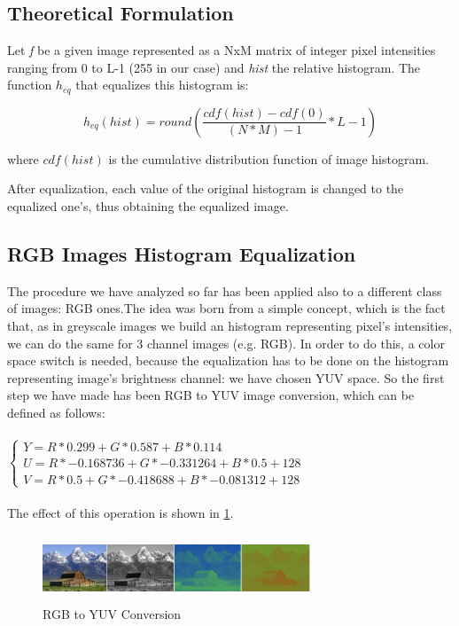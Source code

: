 \documentclass[10pt,twocolumn,letterpaper]{article}
\begin{document}
\subsection{Theoretical Formulation}
Let \textit{f} be a given image represented as a NxM matrix of integer pixel intensities ranging from 0 to L-1 (255 in our case) and \textit{hist} the relative histogram.
The function ${h_{eq}}$ that equalizes this histogram is:

\begin{equation}
	h_{eq}(hist) =  round(\frac{cdf(hist) - cdf(0)}{(N * M) - 1} * L - 1)
	\label{equalization}
\end{equation}

where ${cdf(hist)}$ is the cumulative distribution function of image histogram.

After equalization, each value of the original histogram is changed to the equalized one's, thus obtaining the equalized image.

\subsection{RGB Images Histogram Equalization}
The procedure we have analyzed so far has been applied also to a different class of images: RGB ones.The idea was born from a simple concept, which is the fact that, as in greyscale images we build an histogram representing pixel's intensities, we can do the same for 3 channel images (e.g. RGB). In order to do this, a color space switch is needed, because the equalization has to be done on the histogram representing image's brightness channel: we have chosen YUV space. So the first step we have made has been RGB to YUV image conversion, which can be defined as follows: \\
\\
	$\begin{cases} 
	Y = R * 0.299 + G * 0.587 + B * 0.114 \\
	U = R * -0.168736 + G * -0.331264 + B * 0.5 + 128 \\
	V = R * 0.5 + G * -0.418688 + B * -0.081312 + 128
	\end{cases}$\\
\\
The effect of this operation is shown in \ref{fig:YUV}.

\begin{figure}[h]
	\centering
	\includegraphics[width=8cm, height=2cm]{YUV}
	\caption{RGB to YUV Conversion}
	\label{fig:YUV}
\end{figure}
\end{document}

